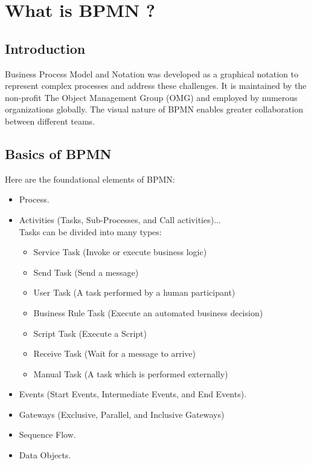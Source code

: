 \documentclass[12pt]{article}
\begin{document}
{  \pagebreak

  \section{What is BPMN ?}

  \subsection{Introduction}

  Business Process Model and Notation was developed as a graphical notation to represent complex processes and address these challenges. It is maintained by the non-profit The Object Management Group (OMG) and employed by numerous organizations globally. The visual nature of BPMN enables greater collaboration between different teams.

  \subsection{Basics of BPMN}

  Here are the foundational elements of BPMN:

  \begin{itemize}
    \item Process.
    \item Activities (Tasks, Sub-Processes, and Call activities)...
      \\
      Tasks can be divided into many types:

      \begin{itemize}
        \item Service Task (Invoke or execute business logic)
        \item Send Task (Send a message)
        \item User Task (A task performed by a human participant)
        \item Business Rule Task (Execute an automated business decision)
        \item Script Task (Execute a Script)
        \item Receive Task (Wait for a message to arrive)
        \item Manual Task (A task which is performed externally)
      \end{itemize}

    \item Events (Start Events, Intermediate Events, and End Events).
    \item Gateways (Exclusive, Parallel, and Inclusive Gateways)
    \item Sequence Flow.
    \item Data Objects.
  \end{itemize}


}
\end{document}
